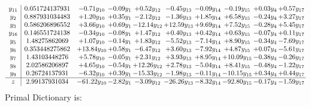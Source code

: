 \documentclass[9pt]{article}
\begin{document}
\[\begin{array}{c| c c@{\hskip 2pt} c@{\hskip 2pt} c@{\hskip 2pt} c@{\hskip 2pt} c@{\hskip 2pt} c@{\hskip 2pt} c@{\hskip 2pt} c@{\hskip 2pt} }
 y_{11}   &  0.051724137931 & -0.71 y_{10} & -0.09 y_{1} & +  0.52 y_{12} & -0.45 y_{13} & -0.09 y_{14} & -0.19 y_{15} & +  0.03 y_{4} & +  0.57 y_{17}\\
 y_{2}   &  0.887931034483 & +  1.20 y_{10} & +  0.35 y_{1} & -2.12 y_{12} & -1.36 y_{13} & +  1.85 y_{14} & +  6.58 y_{15} & -0.24 y_{4} & +  3.27 y_{17}\\
 y_{3}   &  0.586206896552 & +  3.66 y_{10} & +  0.69 y_{1} & -12.14 y_{12} & + 12.59 y_{13} & +  9.69 y_{14} & +  7.52 y_{15} & -0.28 y_{4} & +  5.45 y_{17}\\
 y_{16}   &  0.146551724138 & -0.34 y_{10} & -0.08 y_{1} & +  1.47 y_{12} & +  0.40 y_{13} & +  0.42 y_{14} & +  0.63 y_{15} & -0.07 y_{4} & +  0.11 y_{17}\\
 y_{5}   &  1.48275862069 & +  1.07 y_{10} & -0.14 y_{1} & +  1.83 y_{12} & -5.52 y_{13} & -7.14 y_{14} & +  8.90 y_{15} & -0.34 y_{4} & -7.69 y_{17}\\
 y_{6}   &  0.353448275862 & + 13.84 y_{10} & +  0.58 y_{1} & -6.47 y_{12} & +  3.60 y_{13} & -7.92 y_{14} & +  4.87 y_{15} & +  0.07 y_{4} & -5.61 y_{17}\\
 y_{7}   &  1.43103448276 & +  5.78 y_{10} & -0.05 y_{1} & +  2.31 y_{12} & +  3.93 y_{13} & +  8.95 y_{14} & + 10.09 y_{15} & -0.38 y_{4} & -0.26 y_{17}\\
 y_{8}   &  2.02586206897 & +  4.65 y_{10} & -0.54 y_{1} & + 12.26 y_{12} & +  2.78 y_{13} & -5.04 y_{14} & +  8.41 y_{15} & -0.48 y_{4} & -1.22 y_{17}\\
 y_{9}   &  0.26724137931 & -6.32 y_{10} & +  0.39 y_{1} & -15.33 y_{12} & -1.98 y_{13} & -0.11 y_{14} & -10.15 y_{15} & +  0.34 y_{4} & +  0.44 y_{17}\\
\hline
z    &  2.99137931034 & -61.22 y_{10} & -2.82 y_{1} & -3.09 y_{12} & -26.26 y_{13} & -8.32 y_{14} & -92.80 y_{15} & -0.17 y_{4} & -1.59 y_{17}\\
\end{array}\]
Primal Dictionary is:
\end{document}

